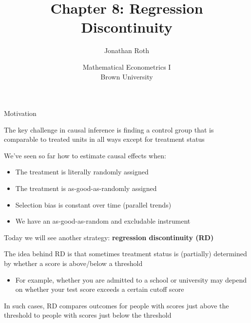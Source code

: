 \documentclass[11pt,english,handout]{beamer}
\newenvironment{wideitemize}{\itemize\addtolength{\itemsep}{10pt}}{\enditemize}
\begin{document}
	
	\begin{frame}[noframenumbering]{}
		\vspace{0.5cm}
		\title[]{Chapter 8: Regression Discontinuity}
		\author{Jonathan Roth}
		\date{Mathematical Econometrics I \\ Brown University\\} 
		\titlepage {\small{}\ }\thispagestyle{empty} \vspace{-30pt}
		
	\end{frame}

	
	\begin{frame}{Motivation}
		
		\vspace{0.2cm}
		\begin{wideitemize}
			\item
			The key challenge in causal inference is finding a control group that is comparable to treated units in all ways except for treatment status\pause{}
			
			\item
			We've seen so far how to estimate causal effects when:\smallskip\pause{}
			\begin{itemize}
			\item The treatment is literally randomly assigned \smallskip\pause{}
			\item The treatment is as-good-as-randomly assigned\smallskip\pause{}
			\item Selection bias is constant over time (parallel trends)\smallskip\pause{}
			\item We have an as-good-as-random and excludable instrument
			\end{itemize} 
						
			\pause
			\item
			Today we will see another strategy: \textbf{regression discontinuity (RD)}
			
			\pause			
			\item
			The idea behind RD is that sometimes treatment status is (partially) determined by whether a score is above/below a threshold
			\pause\smallskip
				\begin{itemize}
					\item 
					For example, whether you are admitted to a school or university may depend on whether your test score exceeds a certain cutoff score
				\end{itemize} 
			
			\pause
			\item
			In such cases, RD compares outcomes for people with scores just above the threshold to people with scores just below the threshold
		\end{wideitemize}
		
	\end{frame}
\end{document}
